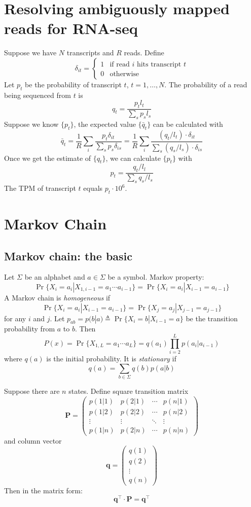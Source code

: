 \documentclass[10pt]{article}
\begin{document}
\section{Resolving ambiguously mapped reads for RNA-seq}

Suppose we have $N$ transcripts and $R$ reads.
Define
$$
\delta_{it}=\left\{\begin{array}{ll}
1 & \mbox{if read $i$ hits transcript $t$} \\
0 & \mbox{otherwise}
\end{array}\right.
$$
Let $p_t$ be the probability of transcript $t$, $t=1,\ldots,N$.
The probability of a read being sequenced from $t$ is
$$
q_t=\frac{p_tl_t}{\sum_s{p_sl_s}}
$$
Suppose we know $\{p_t\}$, the expected value $\{\bar{q}_t\}$ can be calculated with
$$
\bar{q}_t=\frac{1}{R}\sum_i\frac{p_t\delta_{it}}{\sum_s{p_s\delta_{is}}}
=\frac{1}{R}\sum_i\frac{(q_t/l_t)\cdot\delta_{it}}{\sum_s{(q_s/l_s)\cdot\delta_{is}}}
$$
Once we get the estimate of $\{q_t\}$, we can calculate $\{p_t\}$ with
$$
p_t=\frac{q_t/l_l}{\sum_s q_s/l_s}
$$
The TPM of transcript $t$ equals $p_t\cdot10^6$.

\newpage

\section{Markov Chain}

\subsection{Markov chain: the basic}
Let $\Sigma$ be an alphabet and $a\in\Sigma$ be a symbol. Markov property:
$$
\Pr\{X_i=a_i|X_{1,i-1}=a_1\cdots a_{i-1}\}=\Pr\{X_i=a_i|X_{i-1}=a_{i-1}\}
$$
A Markov chain is \emph{homogeneous} if
$$
\Pr\{X_i=a_i|X_{i-1}=a_{i-1}\}=\Pr\{X_j=a_j|X_{j-1}=a_{j-1}\}
$$
for any $i$ and $j$. Let $p_{ab}=p(b|a)\triangleq\Pr\{X_i=b|X_{i-1}=a\}$ be the
transition probability from $a$ to $b$. Then
$$
P(x)=\Pr\{X_{1,L}=a_1\cdots a_L\}=q(a_1)\prod_{i=2}^Lp(a_i|a_{i-1})
$$
where $q(a)$ is the initial probability. It is \emph{stationary} if
$$
q(a)=\sum_{b\in\Sigma} q(b)p(a|b)
$$

Suppose there are $n$ states. Define square transition matrix
$$
\mathbf{P}=\left(\begin{array}{cccc}
p(1|1) & p(2|1) & \cdots & p(n|1) \\
p(1|2) & p(2|2) & \cdots & p(n|2) \\
\vdots & \vdots & \ddots & \vdots \\
p(1|n) & p(2|n) & \cdots & p(n|n)
\end{array}\right)
$$
and column vector
$$
\mathbf{q}=\left(\begin{array}{c}
q(1) \\
q(2) \\
\vdots\\
q(n)
\end{array}\right)
$$
Then in the matrix form:
$$
\mathbf{q}^\intercal\cdot\mathbf{P}=\mathbf{q}^\intercal
$$
\end{document}
